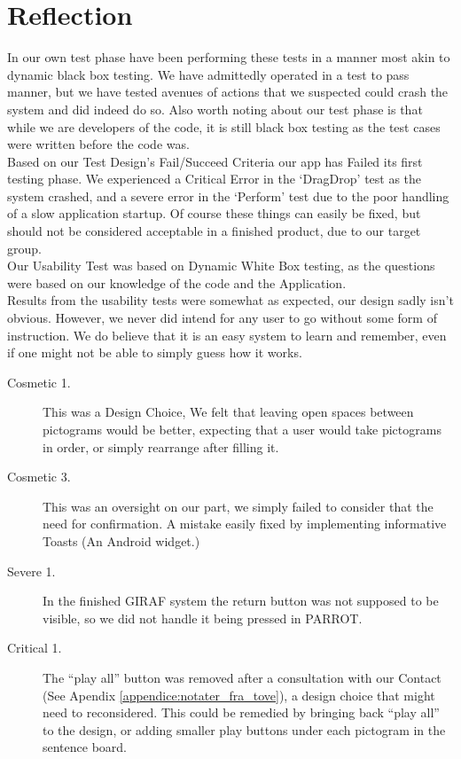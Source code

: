 \section{Reflection}
In our own test phase have been performing these tests in a manner most akin to dynamic black box testing.
We have admittedly operated in a test to pass manner, but we have tested avenues of actions that we suspected could crash the system and did indeed do so.
Also worth noting about our test phase is that while we are developers of the code, it is still black box testing as the test cases were written before the code was.\\
Based on our Test Design's Fail/Succeed Criteria our app has Failed its first testing phase.
We experienced a Critical Error in the `DragDrop' test as the system crashed, and a severe error in the `Perform' test due to the poor handling of a slow application startup.
Of course these things can easily be fixed, but should not be considered acceptable in a finished product, due to our target group.\\

Our Usability Test was based on Dynamic White Box testing, as the questions were based on our knowledge of the code and the Application.\\
Results from the usability tests were somewhat as expected, our design sadly isn't obvious.
However, we never did intend for any user to go without some form of instruction.
We do believe that it is an easy system to learn and remember, even if one might not be able to simply guess how it works.\\

\begin{description}
	\item[Cosmetic 1.] This was a Design Choice, We felt that leaving open spaces between pictograms would be better, expecting that a user would take pictograms in order, or simply rearrange after filling it.
	\item[Cosmetic 3.] This was an oversight on our part, we simply failed to consider that the need for confirmation. A mistake easily fixed by implementing informative Toasts (An Android widget.)
	\item[Severe 1.] In the finished GIRAF system the return button was not supposed to be visible, so we did not handle it being pressed in PARROT.
	\item[Critical 1.] The ``play all'' button was removed after a consultation with our Contact (See Apendix \ref{appendice:notater_fra_tove}), a design choice that might need to reconsidered. This could be remedied by bringing back ``play all'' to the design, or adding smaller play buttons under each pictogram in the sentence board.  
\end{description}



